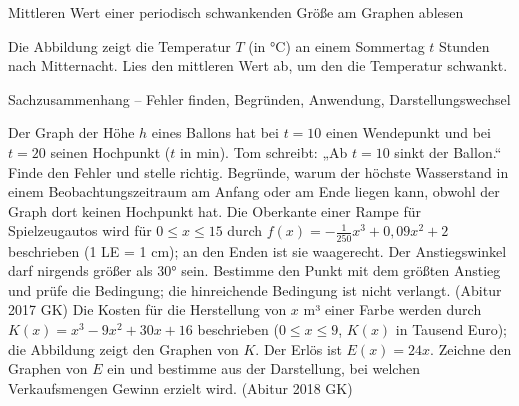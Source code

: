 \begin{aufgabe}{Mittleren Wert einer periodisch schwankenden Größe am Graphen ablesen}
\begin{teile}
\teil Die Abbildung zeigt die Temperatur $T$ (in °C) an einem Sommertag $t$ Stunden nach Mitternacht. Lies den mittleren Wert ab, um den die Temperatur schwankt.

\begin{ksys}[xmin=0,xmax=24,ymin=0,ymax=25,xstep=4,ystep=5,xlabel=t in h,ylabel=T in °C,ablesen]  \end{ksys}
\end{teile}
\end{aufgabe}

\begin{aufgabe}{Sachzusammenhang – Fehler finden, Begründen, Anwendung, Darstellungswechsel}
\begin{teile}
\teil Der Graph der Höhe $h$ eines Ballons hat bei $t = 10$ einen Wendepunkt und bei $t = 20$ seinen Hochpunkt ($t$ in min). Tom schreibt: „Ab $t = 10$ sinkt der Ballon.“ Finde den Fehler und stelle richtig.
\teil Begründe, warum der höchste Wasserstand in einem Beobachtungszeitraum am Anfang oder am Ende liegen kann, obwohl der Graph dort keinen Hochpunkt hat.
\teil Die Oberkante einer Rampe für Spielzeugautos wird für $0 \le x \le 15$ durch $f(x) = -\frac{1}{250}x^3 + 0{,}09x^2 + 2$ beschrieben (1 LE = 1 cm); an den Enden ist sie waagerecht. Der Anstiegswinkel darf nirgends größer als $30°$ sein. Bestimme den Punkt mit dem größten Anstieg und prüfe die Bedingung; die hinreichende Bedingung ist nicht verlangt. \hfill (Abitur 2017 GK)
\teil Die Kosten für die Herstellung von $x$ m³ einer Farbe werden durch $K(x) = x^3 - 9x^2 + 30x + 16$ beschrieben ($0 \le x \le 9$, $K(x)$ in Tausend Euro); die Abbildung zeigt den Graphen von $K$. Der Erlös ist $E(x) = 24x$. Zeichne den Graphen von $E$ ein und bestimme aus der Darstellung, bei welchen Verkaufsmengen Gewinn erzielt wird. \hfill (Abitur 2018 GK)

\begin{ksys}[xmin=0,xmax=9,ymin=0,ymax=300,xstep=1,ystep=50,xlabel=x in m³,ylabel=K,ablesen]  \end{ksys}
\end{teile}
\end{aufgabe}
